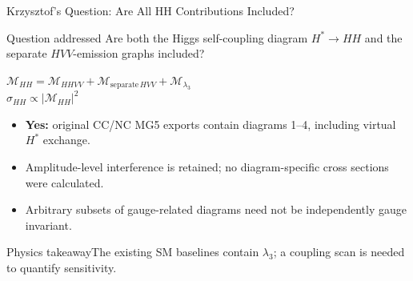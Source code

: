 \documentclass[aspectratio=1610,english]{beamer}
\newcommand{\src}[1]{\vfill{\par\color{black!65}\fontsize{6.4}{7.4}\selectfont\emph{Source:} #1\par}}
\newcommand{\key}[1]{\begin{alertblock}{Physics takeaway}\scriptsize #1\end{alertblock}}
\begin{document}
\begin{frame}[t]{Krzysztof's Question: Are All HH Contributions Included?}
\footnotesize

\begin{alertblock}{Question addressed}
Are both the Higgs self-coupling diagram $H^*\to HH$ and the separate $HVV$-emission graphs included?
\end{alertblock}
\begin{center}\large
$\displaystyle \mathcal M_{HH}=\mathcal M_{HHVV}+\mathcal M_{\mathrm{separate}\,HVV}+\mathcal M_{\lambda_3}$\\[.15em]
$\displaystyle\sigma_{HH}\propto\bigl|\mathcal M_{HH}\bigr|^2$
\end{center}
\begin{itemize}
\item \textbf{Yes:} original CC/NC MG5 exports contain diagrams 1--4, including virtual $H^*$ exchange.
\item Amplitude-level interference is retained; no diagram-specific cross sections were calculated.
\item Arbitrary subsets of gauge-related diagrams need not be independently gauge invariant.
\end{itemize}
\key{The existing SM baselines contain $\lambda_3$; a coupling scan is needed to quantify sensitivity.}

\end{frame}
\end{document}

